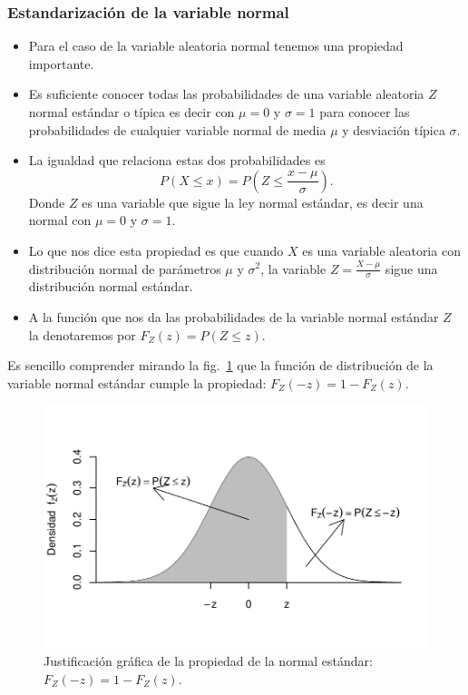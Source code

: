 \subsubsection{Estandarización de la variable normal}
\begin{frame}
\begin{itemize}
\item Para el caso de la variable aleatoria normal tenemos una propiedad importante. 
\item Es suficiente conocer todas las probabilidades de una variable aleatoria $Z$ normal estándar o típica es decir con $\mu=0$ y $\sigma=1$ para conocer las probabilidades de cualquier variable normal de media $\mu$ y desviación típica $\sigma$.
\item  La igualdad que relaciona estas dos probabilidades es
$$P(X\leq x)=P(Z\leq \frac{x-\mu}{\sigma}).$$
Donde $Z$ es una variable que sigue la ley normal estándar, es decir una normal con $\mu=0$ y $\sigma=1$.
\item Lo que nos dice esta propiedad es que cuando $X$ es una variable aleatoria con distribución normal de parámetros $\mu$ y $\sigma^2$, la variable $Z=\frac{X-\mu}{\sigma}$ sigue una distribución normal estándar.
\item A la función que nos da las probabilidades de la variable normal estándar $Z$  la denotaremos por $F_Z(z)=P(Z\leq z).$
\end{itemize}
\end{frame}

\begin{frame}

Es sencillo comprender mirando la fig.~\ref{areanormalestandarderecha} que la función de distribución de la variable normal estándar cumple la propiedad: $F_Z(-z)=1-F_Z(z).$

 \begin{center}
\begin{figure}[htbp]
\includegraphics{./dibujos/02/-009}

\caption{Justificación gráfica de la propiedad de la normal estándar: $F_Z(-z)=1-F_Z(z)$.}
	\label{areanormalestandarderecha}
\end{figure}
\end{center}

\end{frame}


